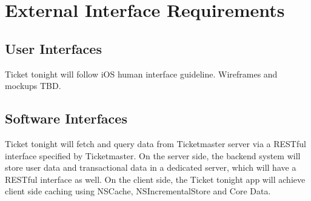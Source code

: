 \section{External Interface Requirements}
	\subsection{User Interfaces}
		Ticket tonight will follow iOS human interface guideline. Wireframes and mockups TBD.
	\subsection{Software Interfaces}
		Ticket tonight will fetch and query data from Ticketmaster server via a RESTful interface specified by Ticketmaster. On the server side, the backend system will store user data and transactional data in a dedicated server, which will have a RESTful interface as well. On the client side, the Ticket tonight app will achieve client side caching using NSCache, NSIncrementalStore and Core Data.